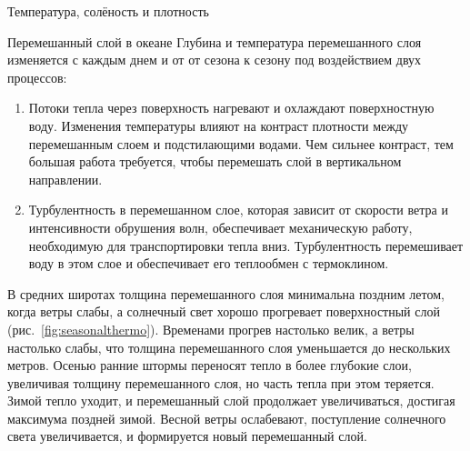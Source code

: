 \begin{chapter}{Температура, солёность и плотность}
\begin{section}{Перемешанный слой в океане}
Глубина и температура перемешанного слоя изменяется с каждым днем и от
от сезона к сезону под воздействием двух процессов:
%
\begin{enumerate}
\item
Потоки тепла через поверхность нагревают и охлаждают поверхностную
воду. Изменения температуры влияют на контраст плотности между
перемешанным слоем и подстилающими водами. Чем сильнее контраст, тем
большая работа требуется, чтобы перемешать слой в вертикальном
направлении.
%

\item
Турбулентность в перемешанном слое, которая зависит от скорости ветра 
и интенсивности обрушения волн, обеспечивает механическую работу,
необходимую для транспортировки тепла вниз. Турбулентность перемешивает 
воду в этом слое и обеспечивает его теплообмен с термоклином.
% 
\end{enumerate}

В средних широтах толщина перемешанного слоя минимальна поздним летом, 
когда ветры слабы, а солнечный свет хорошо прогревает поверхностный
слой (рис.~\ref{fig:seasonalthermo}). Временами прогрев настолько велик, 
а ветры настолько слабы, что толщина перемешанного слоя уменьшается 
до нескольких метров. Осенью ранние штормы переносят тепло в более 
глубокие слои, увеличивая толщину перемешанного слоя, но часть тепла 
при этом теряется. Зимой тепло уходит, и перемешанный слой продолжает 
увеличиваться, достигая максимума поздней зимой. Весной ветры ослабевают, 
поступление солнечного света увеличивается, и формируется новый 
перемешанный слой.
%


\end{section}
\end{chapter}
